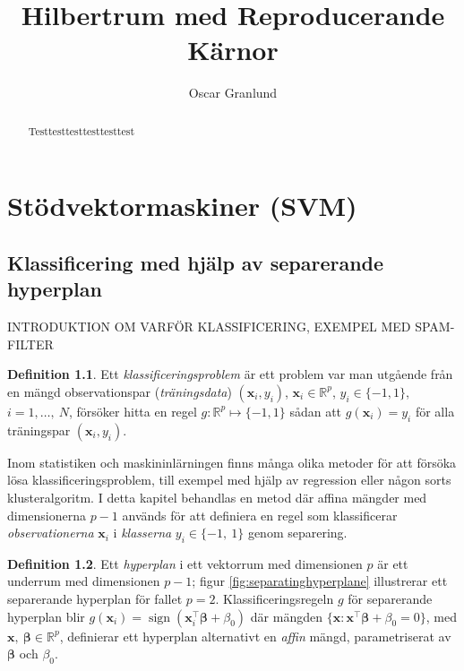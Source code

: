 \documentclass[a4paper, 12pt]{report}
\title{Hilbertrum med Reproducerande Kärnor}
\author{Oscar Granlund}
\DeclareMathOperator{\sign}{sign}
\theoremstyle{definition}
\newtheorem{defi}{Definition}[section]
\theoremstyle{remark}
\newcommand{\bfbeta}{{\boldsymbol{\beta}}}
\begin{document}
\maketitle

\begin{abstract}
	Testtesttesttesttesttest
\end{abstract}

\chapter{Stödvektormaskiner (SVM)}

\section{Klassificering med hjälp av separerande hyperplan}

INTRODUKTION OM VARFÖR KLASSIFICERING, EXEMPEL MED SPAM-FILTER

\begin{defi}
	Ett \textit{klassificeringsproblem} är ett problem var man utgående från en mängd observationspar (\textit{träningsdata}) $(\mathbf{x}_i,y_i)$, $\mathbf{x}_i\in\mathbb{R}^p$, $y_i\in \{-1,1\}$, $i=1,\dots,~N$, försöker hitta en regel $g: \mathbb{R}^p \longmapsto \{-1,1\}$ sådan att $g(\mathbf{x}_i)=y_i$ för alla träningspar $(\mathbf{x}_i,y_i)$.
\end{defi}

Inom statistiken och maskininlärningen finns många olika metoder för att försöka lösa klassificeringsproblem, till exempel med hjälp av regression eller någon sorts klusteralgoritm. I detta kapitel behandlas en metod där affina mängder med dimensionerna $p-1$ används för att definiera en regel som klassificerar \textit{observationerna} $\mathbf{x}_i$ i \textit{klasserna} $y_i\in\{-1,~1\}$ genom separering.

\begin{defi}
	Ett \textit{hyperplan} i ett vektorrum med dimensionen $p$ är ett underrum med dimensionen $p-1$; figur \ref{fig:separatinghyperplane} illustrerar ett separerande hyperplan för fallet $p=2$. Klassificeringsregeln $g$ för separerande hyperplan blir $g(\mathbf{x}_i)=\sign (\mathbf{x}_i^\intercal    \bfbeta + \beta_0)$ där mängden $\{\mathbf{x}: \mathbf{x}^\intercal \bfbeta + \beta_0=0\}$, med $\mathbf{x},~\bfbeta\in \mathbb{R}^p$, definierar ett hyperplan alternativt en \textit{affin} mängd, parametriserat av $\bfbeta$ och $\beta_0$.
\end{defi}
\end{document}

